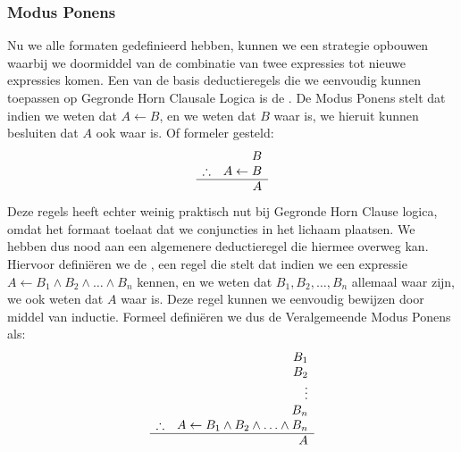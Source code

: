 \subsubsection{Modus Ponens}
Nu we alle formaten gedefinieerd hebben, kunnen we een strategie opbouwen waarbij we doormiddel van de combinatie van twee expressies tot nieuwe expressies komen. Een van de basis deductieregels die we eenvoudig kunnen toepassen op Gegronde Horn Clausale Logica is de . De Modus Ponens stelt dat indien we weten dat $A\leftarrow B$, en we weten dat $B$ waar is, we hieruit kunnen besluiten dat $A$ ook waar is. Of formeler gesteld:
\begin{equation}
\begin{array}{lr}
&B\\
\therefore&A\leftarrow B\\
\hline
&A
\end{array}
\end{equation}
Deze regels heeft echter weinig praktisch nut bij Gegronde Horn Clause logica, omdat het formaat toelaat dat we conjuncties in het lichaam plaatsen. We hebben dus nood aan een algemenere deductieregel die hiermee overweg kan. Hiervoor defini\"eren we de , een regel die stelt dat indien we een expressie $A\leftarrow B_1\wedge B_2\wedge\ldots\wedge B_n$ kennen, en we weten dat $B_1,B_2,\ldots,B_n$ allemaal waar zijn, we ook weten dat $A$ waar is. Deze regel kunnen we eenvoudig bewijzen door middel van inductie. Formeel defini\"eren we dus de Veralgemeende Modus Ponens als:
\begin{equation}
\begin{array}{lr}
&B_1\\
&B_2\\
&\vdots\\
&B_n\\
\therefore&A\leftarrow B_1\wedge B_2\wedge\ldots\wedge B_n\\
\hline
&A
\end{array}
\end{equation}

